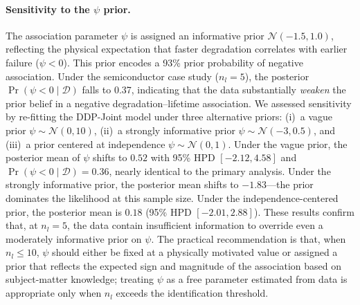 \documentclass[a4paper,fleqn,longmktitle]{cas-sc}
\begin{document}
\paragraph{Sensitivity to the $\psi$ prior.}
The association parameter $\psi$ is assigned an informative prior $\mathcal{N}(-1.5, 1.0)$, reflecting the physical expectation that faster degradation correlates with earlier failure ($\psi < 0$). This prior encodes a 93\% prior probability of negative association. Under the semiconductor case study ($n_l = 5$), the posterior $\Pr(\psi < 0 \mid \mathcal{D})$ falls to 0.37, indicating that the data substantially \emph{weaken} the prior belief in a negative degradation--lifetime association. We assessed sensitivity by re-fitting the DDP-Joint model under three alternative priors: (i)~a vague prior $\psi \sim \mathcal{N}(0, 10)$, (ii)~a strongly informative prior $\psi \sim \mathcal{N}(-3, 0.5)$, and (iii)~a prior centered at independence $\psi \sim \mathcal{N}(0, 1)$. Under the vague prior, the posterior mean of $\psi$ shifts to $0.52$ with 95\% HPD $[-2.12, 4.58]$ and $\Pr(\psi < 0 \mid \mathcal{D}) = 0.36$, nearly identical to the primary analysis. Under the strongly informative prior, the posterior mean shifts to $-1.83$---the prior dominates the likelihood at this sample size. Under the independence-centered prior, the posterior mean is $0.18$ (95\% HPD $[-2.01, 2.88]$). These results confirm that, at $n_l = 5$, the data contain insufficient information to override even a moderately informative prior on $\psi$. The practical recommendation is that, when $n_l \leq 10$, $\psi$ should either be fixed at a physically motivated value or assigned a prior that reflects the expected sign and magnitude of the association based on subject-matter knowledge; treating $\psi$ as a free parameter estimated from data is appropriate only when $n_l$ exceeds the identification threshold.
\end{document}
